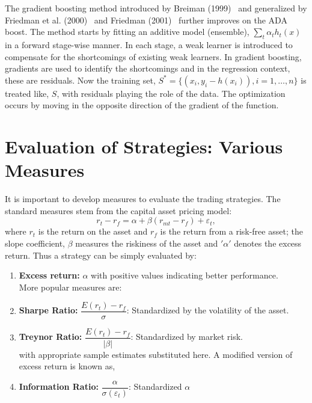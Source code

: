 The gradient boosting method introduced by Breiman (1999)~\cite{breiman1999prediction} and generalized by Friedman et al. (2000)~\cite{friedman2000additive} and Friedman (2001)~\cite{friedman2001greedy} further improves on the ADA boost. The method starts by fitting an additive model (ensemble), $\sum_t \alpha_t h_t (x)$ in a forward stage-wise manner. In each stage, a weak learner is introduced to compensate for the shortcomings of existing weak learners. In gradient boosting, gradients are used to identify the shortcomings and in the regression context, these are residuals. Now the training set, $S^*=\{ (x_i, y_i-h(x_i)) , i =1,\ldots,n \}$ is treated like, $S$, with residuals playing the role of the data. The optimization occurs by moving in the opposite direction of the gradient of the function.



\section{Evaluation of Strategies: Various Measures}


It is important to develop measures to evaluate the trading strategies. The standard measures stem from the capital asset pricing model:
	\begin{equation}
	r_{t} - r_f = \alpha + \beta (r_{mt} - r_f) + \varepsilon_{t},
	\end{equation}
where $r_t$ is the return on the asset and $r_f$ is the return from a risk-free asset; the slope coefficient, $\beta$ measures the riskiness of the asset and $'\alpha'$ denotes the excess return. Thus a strategy can be simply evaluated by: 

\begin{enumerate}[--]
\item \textbf{Excess return: }$\alpha$ with positive values indicating better performance. \\

\noindent More popular measures are:\\

\item \textbf{Sharpe Ratio: } $\dfrac{E(r_{t}) - r_f}{\sigma}$: Standardized by the volatility of the asset. \\

\item \textbf{Treynor Ratio: } $\dfrac{E(r_{t}) - r_f}{\left|\beta \right|}$: Standardized by market risk. \\

\noindent with appropriate sample estimates substituted here. A modified version of excess return is known as, \\

\item \textbf{Information Ratio: } $\dfrac{\alpha}{\sigma(\varepsilon_{t})}$: Standardized $\alpha$
\end{enumerate}


